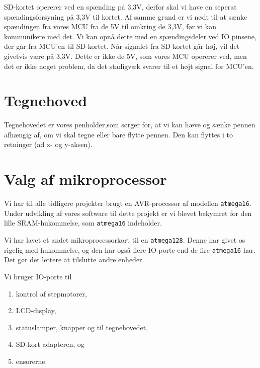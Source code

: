 SD-kortet opererer ved en spænding på 3,3V, derfor skal vi have en
seperat spændingsforsyning på 3,3V til kortet. Af samme grund er vi
nødt til at sænke spændingen fra vores MCU fra de 5V til omkring de
3,3V, før vi kan kommunikere med det. Vi kan opnå dette med en
spændingsdeler ved IO pinsene, der går fra MCU'en til SD-kortet. Når
signalet fra SD-kortet går høj, vil det givetvis være på 3,3V. Dette
er ikke de 5V, som vores MCU opererer ved, men det er ikke noget
problem, da det stadigvæk svarer til et højt signal for MCU'en.


\section{Tegnehoved}
\label{sc:d-tegnehoved}

Tegnehovedet er vores penholder,som sørger for, at vi kan hæve og sænke
pennen afhængig af, om vi skal tegne eller bare flytte pennen. Den kan
flyttes i to retninger (ad x- og y-aksen).


\section{Valg af mikroprocessor}
\label{sc:d-mikroprocessor}

Vi har til alle tidligere projekter brugt en AVR-processor af modellen
\texttt{atmega16}. Under udvikling af vores software til dette projekt
er vi blevet bekymret for den lille SRAM-hukommelse, som
\texttt{atmega16} indeholder.

Vi har lavet et andet mikroprocessorkort til en
\texttt{atmega128}. Denne har givet os rigelig med hukommelse, og den
har også flere IO-porte end de fire \texttt{atmega16} har. Det gør det
lettere at tilslutte andre enheder.

Vi bruger IO-porte til
\begin{enumerate} \firmlist
\item{kontrol af stepmotorer,}
\item{LCD-display,}
\item{statuslamper, knapper og til tegnehovedet,}
\item{SD-kort adapteren, og}
\item{ensorerne.}
\end{enumerate}


